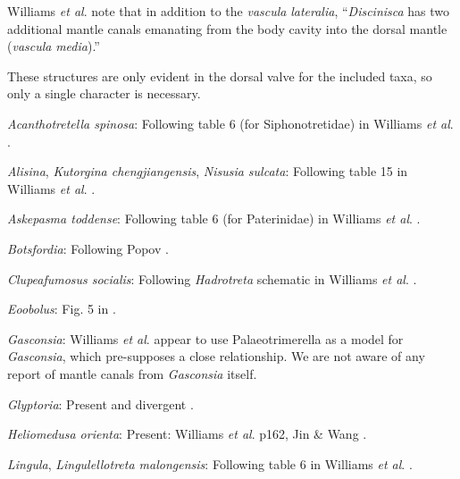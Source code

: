 \documentclass[openany]{book}
\theoremstyle{definition}
\theoremstyle{definition}
\theoremstyle{definition}
\theoremstyle{remark}
\begin{document}
Williams \emph{et al}. \citeyearpar{Williams1997Introduction} note that
in addition to the \emph{vascula} \emph{lateralia}, ``\emph{Discinisca}
has two additional mantle canals emanating from the body cavity into the
dorsal mantle (\emph{vascula} \emph{media}).''

These structures are only evident in the dorsal valve for the included
taxa, so only a single character is necessary.

\hypertarget{Acanthotretella_spinosa-coding-36}{}
\emph{Acanthotretella spinosa}: Following table 6 (for Siphonotretidae)
in Williams \emph{et al}.
\citeyearpar{Williams2000LinguliformeaCraniiformea}.

\hypertarget{Alisina-coding-36}{}
\emph{Alisina}, \emph{Kutorgina chengjiangensis}, \emph{Nisusia
sulcata}: Following table 15 in Williams \emph{et al}.
\citeyearpar{Williams2000LinguliformeaCraniiformea}.

\hypertarget{Askepasma_toddense-coding-36}{}
\emph{Askepasma toddense}: Following table 6 (for Paterinidae) in
Williams \emph{et al}.
\citeyearpar{Williams2000LinguliformeaCraniiformea}.

\hypertarget{Botsfordia-coding-36}{}
\emph{Botsfordia}: Following Popov \citeyearpar[fig.
2]{Popov1992TheCambrian}.

\hypertarget{Clupeafumosus_socialis-coding-36}{}
\emph{Clupeafumosus socialis}: Following \emph{Hadrotreta} schematic in
Williams \emph{et al}.
\citeyearpar{Williams2000LinguliformeaCraniiformea}.

\hypertarget{Eoobolus-coding-36}{}
\emph{Eoobolus}: Fig. 5 in \citet{Balthasar2009Thebrachiopod}.

\hypertarget{Gasconsia-coding-36}{}
\emph{Gasconsia}: Williams \emph{et al}. \citeyearpar[table
15]{Williams2000LinguliformeaCraniiformea} appear to use
Palaeotrimerella \citep[as drawn in][]{Williams1997Introduction} as a
model for \emph{Gasconsia}, which pre-supposes a close relationship. We
are not aware of any report of mantle canals from \emph{Gasconsia}
itself.

\hypertarget{Glyptoria-coding-36}{}
\emph{Glyptoria}: Present and divergent
\citep{Williams2000LinguliformeaCraniiformea}.

\hypertarget{Heliomedusa_orienta-coding-36}{}
\emph{Heliomedusa orienta}: Present: Williams \emph{et al}.
\citeyearpar{Williams2000LinguliformeaCraniiformea} p162, Jin \& Wang
\citeyearpar{Jin1992Revisionof}.

\hypertarget{Lingula-coding-36}{}
\emph{Lingula}, \emph{Lingulellotreta malongensis}: Following table 6 in
Williams \emph{et al}.
\citeyearpar{Williams2000LinguliformeaCraniiformea}.
\end{document}
